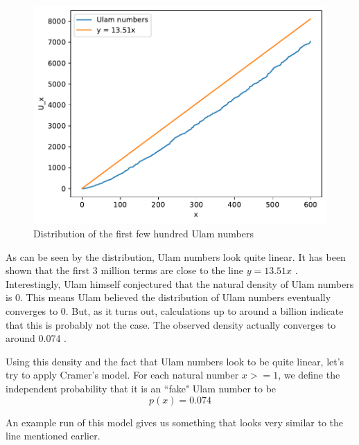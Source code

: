 \documentclass[conference]{IEEEtran}
\begin{document}
\begin{figure}[H]
  \centering
  \includegraphics[width=\linewidth,keepaspectratio]{../images/Ulam_distribution.pdf}
  \caption{Distribution of the first few hundred Ulam numbers}
\end{figure}

As can be seen by the distribution, Ulam numbers look quite linear. It has been shown that the first 3 million terms are close to the line $y = 13.51x$ \cite{b2}. Interestingly, Ulam himself conjectured that the natural density of Ulam numbers is 0. This means Ulam believed the distribution of Ulam numbers eventually converges to 0. But, as it turns out, calculations up to around a billion indicate that this is probably not the case. The observed density actually converges to around 0.074 \cite{b2}. 

Using this density and the fact that Ulam numbers look to be quite linear, let's try to apply Cramer's model. For each natural number $x >= 1$, we define the independent probability that it is an ``fake" Ulam number to be \[p(x) = 0.074\]

An example run of this model gives us something that looks very similar to the line mentioned earlier.
\end{document}
